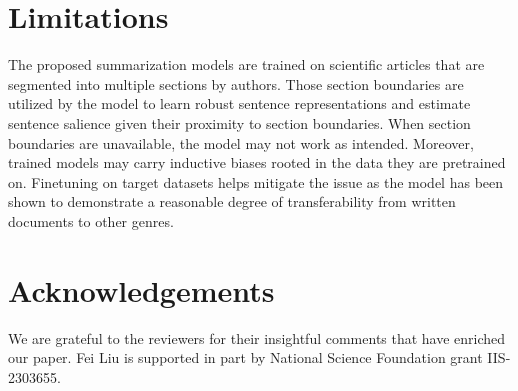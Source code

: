 \documentclass[11pt]{article}
\begin{document}
\section{Limitations}

The proposed summarization models are trained on scientific articles that are segmented into multiple sections by authors.
Those section boundaries are utilized by the model to learn robust sentence representations and estimate sentence salience given their proximity to section boundaries.
When section boundaries are unavailable, the model may not work as intended.
Moreover, trained models may carry inductive biases rooted in the data they are pretrained on.
Finetuning on target datasets helps mitigate the issue as 
the model has been shown to demonstrate a reasonable degree of transferability from written documents to other genres.


\section*{Acknowledgements}

We are grateful to the reviewers for their insightful comments that have enriched our paper.
Fei Liu is supported in part by National Science Foundation grant IIS-2303655.



\end{document}
